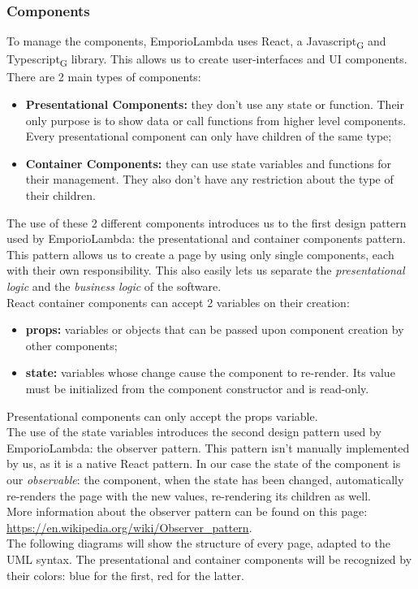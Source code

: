 \subsubsection{Components}
To manage the components, EmporioLambda uses React, a Javascript\textsubscript{G} and Typescript\textsubscript{G} library. This allows us to create user-interfaces and UI components.
There are 2 main types of components:
\begin{itemize}
\item \textbf{Presentational Components:} they don't use any state or function. Their only purpose is to show data or call functions from higher level components. Every presentational component can only have children of the same type;
\item \textbf{Container Components:} they can use state variables and functions for their management. They also don't have any restriction about the type of their children.
\end{itemize}
The use of these 2 different components introduces us to the first design pattern used by EmporioLambda: the presentational and container components pattern. This pattern allows us to create a page by using only single components, each with their own responsibility. This also easily lets us separate the \textit{presentational logic} and the \textit{business logic} of the software.\\
React container components can accept 2 variables on their creation:
\begin{itemize}
\item \textbf{props:} variables or objects that can be passed upon component creation by other components;
\item \textbf{state:} variables whose change cause the component to re-render. Its value must be initialized from the component constructor and is read-only.
\end{itemize}
Presentational components can only accept the props variable.\\
The use of the state variables introduces the second design pattern used by EmporioLambda: the observer pattern. This pattern isn't manually implemented by us, as it is a native React pattern. In our case the state of the component is our \textit{observable}: the component, when the state has been changed, automatically re-renders the page with the new values, re-rendering its children as well.\\More information about the observer pattern can be found on this page:\\
\url{https://en.wikipedia.org/wiki/Observer_pattern}.\\

The following diagrams will show the structure of every page, adapted to the UML syntax. The presentational and container components will be recognized by their colors: blue for the first, red for the latter. 

